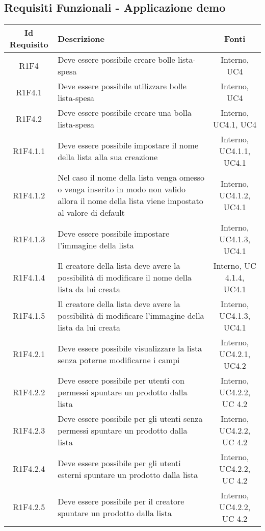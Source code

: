 \newpage
\subsection{Requisiti Funzionali - Applicazione demo}
\normalsize
\begingroup
\renewcommand\arraystretch{2}
\begin{longtable}{|c|>{\centering}m{7cm}|c|}
\hline
\textbf{Id Requisito} & \textbf{Descrizione} & \textbf{Fonti}\\
\hline
\endhead
			R1F4 & Deve essere possibile creare bolle lista-spesa  & Interno, UC4 \\
			\hline
			R1F4.1 & Deve essere possibile utilizzare bolle lista-spesa  & Interno, UC4 \\
			\hline
			R1F4.2 & Deve essere possibile creare una bolla lista-spesa & Interno, UC4.1, UC4 \\
			\hline
			R1F4.1.1 & Deve essere possibile impostare il nome della lista alla sua creazione & Interno, UC4.1.1, UC4.1 \\
			\hline
			R1F4.1.2 & Nel caso il nome della lista venga omesso o venga inserito in modo non valido allora il nome della lista viene impostato al valore di default & Interno, UC4.1.2, UC4.1 \\
			\hline
			R1F4.1.3 & Deve essere possibile impostare l'immagine della lista & Interno, UC4.1.3, UC4.1 \\
			\hline
			R1F4.1.4 & Il creatore della lista deve avere la possibilità di modificare il nome della lista da lui creata & Interno, UC 4.1.4, UC4.1 \\
			\hline
			R1F4.1.5 & Il creatore della lista deve avere la possibilità di modificare l'immagine della lista da lui creata & Interno, UC4.1.3, UC4.1 \\
			\hline
			R1F4.2.1 & Deve essere possibile visualizzare la lista senza poterne modificarne i campi & Interno, UC4.2.1, UC4.2 \\
			\hline
			R1F4.2.2 & Deve essere possibile per utenti con permessi spuntare un prodotto dalla lista & Interno, UC4.2.2, UC 4.2 \\
			\hline
			R1F4.2.3 & Deve essere possibile per gli utenti senza permessi spuntare un prodotto dalla lista & Interno, UC4.2.2, UC 4.2 \\
			\hline
			R1F4.2.4 & Deve essere possibile per gli utenti esterni spuntare un prodotto dalla lista & Interno, UC4.2.2, UC 4.2 \\
			\hline
			R1F4.2.5 & Deve essere possibile per il creatore spuntare un prodotto dalla lista & Interno, UC4.2.2, UC 4.2 \\

\end{longtable}
